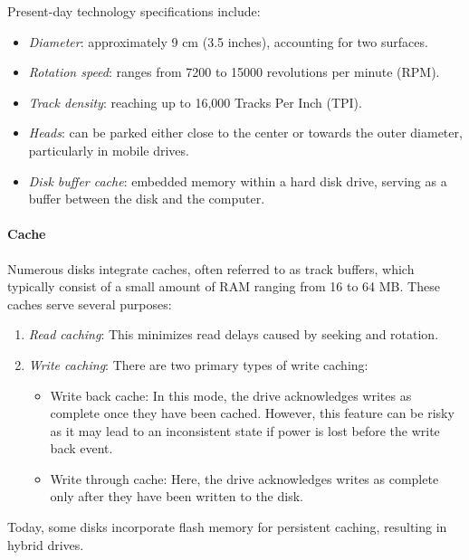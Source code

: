 Present-day technology specifications include:
\begin{itemize}
    \item \textit{Diameter}: approximately 9 cm (3.5 inches), accounting for two surfaces.
    \item \textit{Rotation speed}: ranges from 7200 to 15000 revolutions per minute (RPM).
    \item \textit{Track density}: reaching up to 16,000 Tracks Per Inch (TPI).
    \item \textit{Heads}: can be parked either close to the center or towards the outer diameter, particularly in mobile drives.
    \item \textit{Disk buffer cache}: embedded memory within a hard disk drive, serving as a buffer between the disk and the computer.
\end{itemize}

\paragraph*{Cache}
Numerous disks integrate caches, often referred to as track buffers, which typically consist of a small amount of RAM ranging from 16 to 64 MB. These caches serve several purposes:
\begin{enumerate}
    \item \textit{Read caching}: This minimizes read delays caused by seeking and rotation.
    \item \textit{Write caching}: There are two primary types of write caching:
        \begin{itemize}
            \item Write back cache: In this mode, the drive acknowledges writes as complete once they have been cached. 
                However, this feature can be risky as it may lead to an inconsistent state if power is lost before the write back event.
            \item Write through cache: Here, the drive acknowledges writes as complete only after they have been written to the disk.
        \end{itemize}
\end{enumerate}
Today, some disks incorporate flash memory for persistent caching, resulting in hybrid drives.

